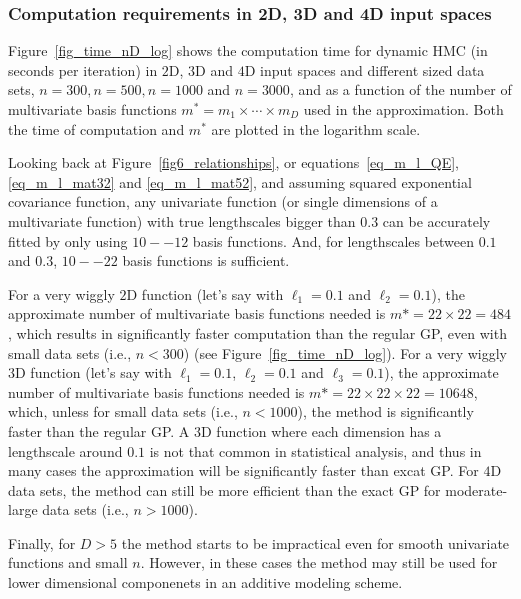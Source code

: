 \subsubsection{Computation requirements in 2D, 3D and 4D input spaces}\label{sec_computation_nD}


Figure~\ref{fig_time_nD_log} shows the computation time for dynamic HMC (in seconds per iteration) in $2$D, $3$D and $4$D input spaces and different sized data sets, $n=300, n=500, n=1000$ and $n=3000$, and as a function of the number of multivariate basis functions $m^*=m_1\times \cdots \times m_D$ used in the approximation.
Both the time of computation and $m^*$ are plotted in the logarithm scale. 

Looking back at Figure~\ref{fig6_relationships}, or equations~\eqref{eq_m_l_QE}, \eqref{eq_m_l_mat32} and \eqref{eq_m_l_mat52}, and assuming squared exponential covariance function, any univariate function (or single dimensions of a multivariate function) with true lengthscales bigger than $0.3$ can be accurately fitted by only using $10--12$ basis functions.  And, for lengthscales between $0.1$ and $0.3$, $10--22$ basis functions is sufficient.

For a very wiggly $2$D function (let's say with $\ell_1=0.1$ and $\ell_2=0.1$), the approximate number of multivariate basis functions needed is $m*=22\times 22= 484$, which results in significantly faster computation than the regular GP, even with small data sets (i.e., $n<300$) (see Figure~\ref{fig_time_nD_log}). For a very wiggly $3$D function (let's say with $\ell_1=0.1$, $\ell_2=0.1$ and $\ell_3=0.1$), the approximate number of multivariate basis functions needed is $m*=22\times 22\times 22= 10648$, which, unless for small data sets (i.e., $n<1000$), the method is significantly faster than the regular GP. A $3$D function where each dimension has a lengthscale around $0.1$ is not that common in statistical analysis, and thus in many cases the approximation will be significantly faster than excat GP. For $4$D data sets, the method can still be more efficient than the exact GP for moderate-large data sets (i.e., $n>1000$). 

Finally, for $D>5$ the method starts to be impractical even for smooth univariate functions and small $n$. However, in these cases the method may still be used for lower dimensional componenets in an additive modeling scheme.

